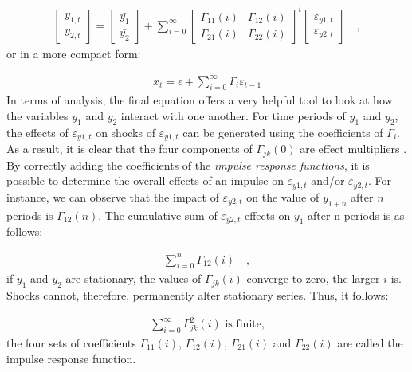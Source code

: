 \begin{align} \label{eq:mavar1}
    \begin{bmatrix}
    y_{1,t} \\
    y_{2,t}
    \end{bmatrix} = 
    \begin{bmatrix}
    \bar{y_1}\\
    \bar{y_2}
    \end{bmatrix} + \sum_{i=0}^{\infty}
    \begin{bmatrix}
    \Gamma_{11}(i) & \Gamma_{12}(i) \\
    \Gamma_{21}(i) & \Gamma_{22}(i)
    \end{bmatrix}^i
    \begin{bmatrix}
    \varepsilon_{y1, t} \\
    \varepsilon_{y2, t}
    \end{bmatrix} \quad ,
\end{align}
or in a more compact form:

\begin{align*}
    x_t = \epsilon + \sum_{i=0}^{\infty}\Gamma_i \varepsilon_{t-1}
\end{align*}
In terms of analysis, the final equation offers a very helpful tool to look at how the variables $y_1$ and $y_2$ interact with one another. For time periods of $y_1$ and $y_2$, the effects of $\varepsilon_{y1, t}$ on shocks of $\varepsilon_{y1, t}$ can be generated using the coefficients of $\Gamma_i$. As a result, it is clear that the four components of $\Gamma_{jk}(0)$ are effect multipliers \cite[p.295]{enders2008applied}.\\

By correctly adding the coefficients of the \textit{impulse response functions}, it is possible to determine the overall effects of an impulse on $\varepsilon_{y1, t}$ and/or $\varepsilon_{y2, t}$. For instance, we can observe that the impact of $\varepsilon_{y2, t}$ on the value of $y_{1+n}$ after $n$ periods is $\Gamma_{12}(n)$. The cumulative sum of $\varepsilon_{y2, t}$ effects on $y_1$ after n periods is as follows:

\begin{align*}
    \sum_{i=0}^{n}\Gamma_{12}(i) \quad ,
\end{align*}
if $y_1$ and $y_2$ are stationary, the values of $\Gamma_{jk}(i)$ converge to zero, the larger $i$ is. Shocks cannot, therefore, permanently alter stationary series. Thus, it follows:

\begin{align*}
    \sum_{i=0}^{\infty}\Gamma^2 _{jk}(i) \text{ is finite,}
\end{align*}
the four sets of coefficients $\Gamma_{11}(i)$, $\Gamma_{12}(i)$, $\Gamma_{21}(i)$ and $\Gamma_{22}(i)$ are called the impulse response function.

